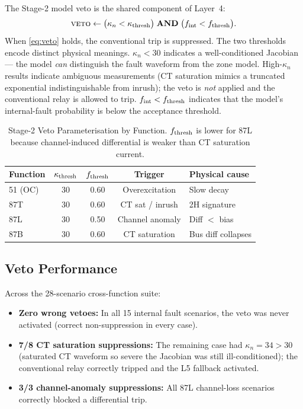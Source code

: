 \documentclass[journal,twoside]{IEEEtran}
\begin{document}
The Stage-2 model veto is the shared component of Layer~4:
\begin{equation}
  \textsc{veto} \leftarrow \bigl(\kappa_n < \kappa_{\rm thresh}\bigr)
    \;\mathbf{AND}\;
    \bigl(f_{\rm int} < f_{\rm thresh}\bigr).
  \label{eq:veto}
\end{equation}
When \eqref{eq:veto} holds, the conventional trip is suppressed.
The two thresholds encode distinct physical meanings.
$\kappa_n < 30$ indicates a well-conditioned Jacobian --- the model
\emph{can} distinguish the fault waveform from the zone model.
High-$\kappa_n$ results indicate ambiguous measurements (CT saturation mimics a
truncated exponential indistinguishable from inrush); the veto is \emph{not}
applied and the conventional relay is allowed to trip.
$f_{\rm int} < f_{\rm thresh}$ indicates that the model's internal-fault
probability is below the acceptance threshold.

\begin{table}[h]
  \centering
  \caption{Stage-2 Veto Parameterisation by Function.
    $f_{\rm thresh}$ is lower for 87L because channel-induced differential
    is weaker than CT saturation current.}
  \label{tab:veto}
  \begin{tabular}{@{}lcccl@{}}
    \toprule
    Function & $\kappa_{\rm thresh}$ & $f_{\rm thresh}$ & Trigger & Physical cause \\
    \midrule
    51 (OC) & 30 & 0.60 & Overexcitation & Slow decay \\
    87T     & 30 & 0.60 & CT sat / inrush & 2H signature \\
    87L     & 30 & 0.50 & Channel anomaly & Diff $<$ bias \\
    87B     & 30 & 0.60 & CT saturation & Bus diff collapses \\
    \bottomrule
  \end{tabular}
\end{table}

\subsection{Veto Performance}

Across the 28-scenario cross-function suite:
\begin{itemize}
  \item \textbf{Zero wrong vetoes:} In all 15 internal fault scenarios, the
    veto was never activated (correct non-suppression in every case).
  \item \textbf{7/8 CT saturation suppressions:} The remaining case had
    $\kappa_n = 34 > 30$ (saturated CT waveform so severe the Jacobian was
    still ill-conditioned); the conventional relay correctly tripped and the
    L5 fallback activated.
  \item \textbf{3/3 channel-anomaly suppressions:} All 87L channel-loss
    scenarios correctly blocked a differential trip.
\end{itemize}
\end{document}

